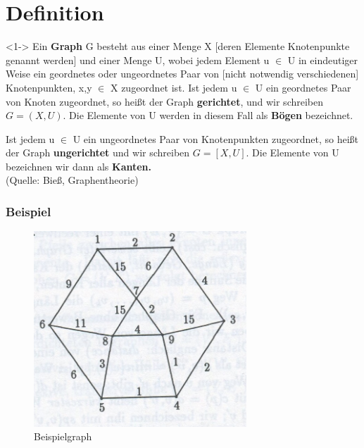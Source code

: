 \section{Definition}

\begin{frame}
	\begin{block}<1->{}
				Ein \textbf{Graph} G besteht aus einer Menge X [deren Elemente Knotenpunkte genannt werden] und einer Menge U, wobei jedem Element u $\in$ U in eindeutiger Weise ein geordnetes oder ungeordnetes Paar von [nicht notwendig verschiedenen] Knotenpunkten, x,y $\in$ X zugeordnet ist.
				Ist jedem u $\in$ U ein geordnetes Paar von Knoten zugeordnet, so heißt der Graph \textbf{gerichtet}, und wir schreiben 
				$G= (X, U)$.
				Die Elemente von U werden in diesem Fall als \textbf{Bögen} bezeichnet.

				Ist jedem u $\in$ U ein ungeordnetes Paar von Knotenpunkten zugeordnet, so heißt der Graph \textbf{ungerichtet} und wir schreiben 
				$G=[X,U]$. 
				Die Elemente von U bezeichnen wir dann als \textbf{Kanten.} \\
				\tiny (Quelle: Bieß, Graphentheorie)
	\end{block}
\end{frame}

\begin{frame}
\frametitle{Beispiel}
	\begin{figure}[h]
\centering
\includegraphics[width = 8cm]{./pictures/Graph.jpg}
\caption{Beispielgraph %
}
\label{a1}
\end{figure}
\end{frame}
	